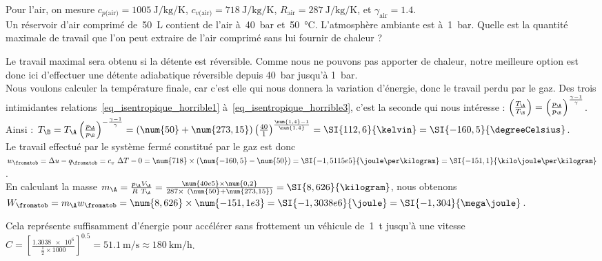 		\begin{anexample}
			Pour l’air, on mesure $c_{p\text{(air)}} = \SI{1005}{\joule\per\kilogram\per\kelvin}$, $c_{v\text{(air)}} = \SI{718}{\joule\per\kilogram\per\kelvin}$, $R_\text{air} = \SI{287}{\joule\per\kilogram\per\kelvin}$, et $\gamma_\text{air} = \num{1,4}$.\\
			Un réservoir d’air comprimé de~\SI{50}{\liter} contient de l’air à~\SI{40}{\bar} et~\SI{50}{\degreeCelsius}. L’atmosphère ambiante est à~\SI{1}{\bar}. Quelle est la quantité maximale de travail que l’on peut extraire de l’air comprimé sans lui fournir de chaleur ?
				\begin{answer}
					Le travail maximal sera obtenu si la détente est réversible. Comme nous ne pouvons pas apporter de chaleur, notre meilleure option est donc ici d’effectuer une détente adiabatique réversible depuis \SI{40}{\bar} jusqu’à \SI{1}{\bar}.\\
					Nous voulons calculer la température finale, car c’est elle qui nous donnera la variation d’énergie, donc le travail perdu par le gaz. Des trois intimidantes relations~\ref{eq_isentropique_horrible1} à~\ref{eq_isentropique_horrible3}, c’est la seconde qui nous intéresse : $\left( \frac{T_\A}{T_\B} \right)	= \left( \frac{p_\A}{p_\B} \right)^{\frac{\gamma -1}{\gamma}}$. Ainsi : $T_\B = T_\A \left( \frac{p_\A}{p_\B} \right)^{-\frac{\gamma -1}{\gamma}} = (\num{50} + \num{273,15}) \left( \frac{40}{1} \right)^{\frac{\num{1,4} -1}{\num{1,4}}} = \SI{112,6}{\kelvin} = \SI{-160,5}{\degreeCelsius}$.\\
					Le travail effectué par le système fermé constitué par le gaz est donc $w_\fromatob = \Delta u - q_\fromatob = c_v \ \Delta T - 0 = \num{718} \times (\num{-160,5} - \num{50}) = \SI{-1,5115e5}{\joule\per\kilogram} = \SI{-151,1}{\kilo\joule\per\kilogram}$.\\
					En calculant la masse $m_\A = \frac{p_\A V_\A}{R \ T_\A} = \frac{\num{40e5} \times \num{0,2}}{287 \times \ (\num{50} + \num{273,15})} = \SI{8,626}{\kilogram}$, nous obtenons $W_\fromatob = m_\A w_\fromatob = \num{8,626} \times \num{-151,1e3} = \SI{-1,3038e6}{\joule} = \SI{-1,304}{\mega\joule}$.
					\begin{remark} Cela représente suffisamment d’énergie pour accélérer sans frottement un véhicule de~\SI{1}{\tonne} jusqu’à une vitesse $C = \left[\frac{\num{1,3038e6}}{\frac{1}{2} \times \num{1000}}\right]^{\num{0,5}} = \SI{51,1}{\metre\per\second} \approx \SI[per-mode = symbol]{180}{\kilo\metre\per\hour}$.\end{remark}

\end{answer}
\end{anexample}

